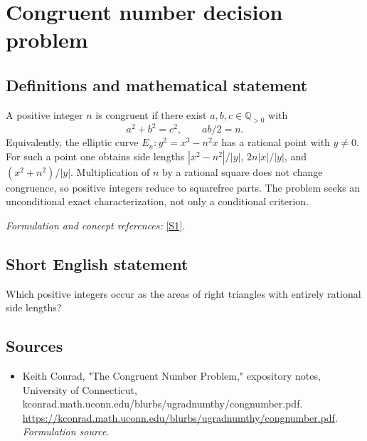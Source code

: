 \documentclass[11pt]{article}
\begin{document}
\section*{\texorpdfstring{Congruent number decision problem}{Congruent number decision problem}}\label{statement}
\subsection{Definitions and mathematical statement}
A positive integer $n$ is congruent if there exist $a,b,c\in{\mathbb{Q}}_{>0}$ with
\[
 a^2+b^2=c^2,\qquad ab/2=n.
\]
Equivalently, the elliptic curve $E_n:y^2=x^3-n^2x$ has a rational point with $y\ne0$. For such a point one obtains side lengths $|x^2-n^2|/|y|$, $2n|x|/|y|$, and $(x^2+n^2)/|y|$. Multiplication of $n$ by a rational square does not change congruence, so positive integers reduce to squarefree parts. The problem seeks an unconditional exact characterization, not only a conditional criterion.
\par\smallskip\textit{Formulation and concept references:} \href{https://kconrad.math.uconn.edu/blurbs/ugradnumthy/congnumber.pdf}{[S1]}.

\subsection{Short English statement}
Which positive integers occur as the areas of right triangles with entirely rational side lengths?
\subsection{Sources}
\begin{itemize}
\item[S1]Keith Conrad, "The Congruent Number Problem," expository notes, University of Connecticut, kconrad.math.uconn.edu/blurbs/ugradnumthy/congnumber.pdf.
\url{https://kconrad.math.uconn.edu/blurbs/ugradnumthy/congnumber.pdf}.
\textit{Formulation source.}
\end{itemize}
\end{document}
